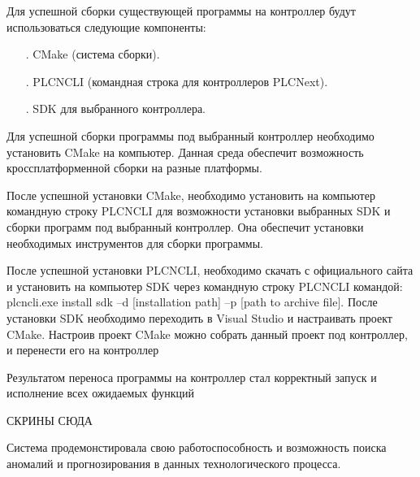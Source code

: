 \subtitlespace

{\gostFont

	\par \redline Для успешной сборки существующей программы на контроллер будут использоваться следующие компоненты:

	\begin{itemize}[leftmargin=2.15cm, labelwidth=0.65cm, labelsep=0.0cm] 

		\item[\theitemcntr. ] CMake (система сборки).
		\addtocounter{itemcntr}{1}

		\item[\theitemcntr. ] PLCNCLI (командная строка для контроллеров PLCNext).
        \addtocounter{itemcntr}{1}

		\item[\theitemcntr. ] SDK для выбранного контроллера.
        \addtocounter{itemcntr}{1}		

		\setcounter{itemcntr}{1}
	\end{itemize}

	\par \redline Для успешной сборки программы под выбранный контроллер необходимо установить CMake на компьютер. Данная среда обеспечит возможность кроссплатформенной сборки на разные платформы.

	\par \redline После успешной установки CMake, необходимо установить на компьютер командную строку PLCNCLI для возможности установки выбранных SDK и сборки программ под выбранный контроллер. Она обеспечит установки необходимых инструментов для сборки программы.

	\par \redline После успешной установки PLCNCLI, необходимо скачать с официального сайта и установить на компьютер SDK через командную строку PLCNCLI командой: plcncli.exe install sdk –d [installation path] –p [path to archive file].  После установки SDK необходимо переходить в Visual Studio и настраивать проект CMake. Настроив проект CMake можно собрать данный проект под контроллер, и перенести его на контроллер  

	\par \redline Результатом переноса программы на контроллер стал корректный запуск и исполнение всех ожидаемых функций

	\par \redline СКРИНЫ СЮДА

	\par \redline Система продемонстировала свою работоспособность и возможность поиска аномалий и прогнозирования в данных технологического процесса.

	\par
}

\setcounter{subchaptercntr}{1}
\setcounter{formulacntr}{1}
\setcounter{imagecntr}{1}
\setcounter{tablecntr}{1}
\setcounter{itemcntr}{1}
